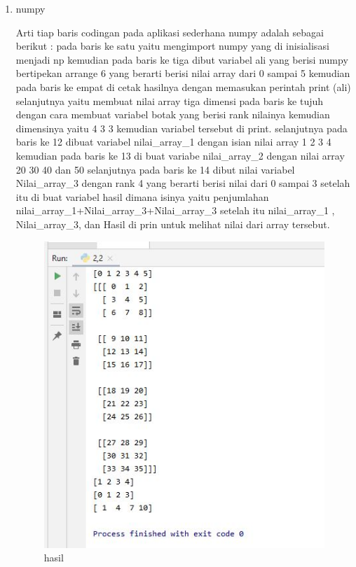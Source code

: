 \begin{enumerate}
\item numpy\par
Arti tiap baris codingan pada aplikasi sederhana numpy adalah sebagai berikut : pada baris ke satu yaitu mengimport numpy yang di inisialisasi menjadi np kemudian pada baris ke tiga dibut variabel ali yang berisi numpy bertipekan arrange 6 yang berarti berisi nilai array dari 0 sampai 5 kemudian pada baris ke empat di cetak hasilnya dengan memasukan perintah print (ali) selanjutnya yaitu membuat nilai array tiga dimensi pada baris ke tujuh dengan cara membuat variabel botak yang berisi rank nilainya kemudian dimensinya yaitu 4 3 3 kemudian variabel tersebut di print. selanjutnya pada baris ke 12 dibuat variabel nilai\_array\_1 dengan isian nilai array 1 2 3 4 kemudian pada baris ke 13 di buat variabe nilai\_array\_2 dengan nilai array 20 30 40 dan 50 selanjutnya pada baris ke 14 dibut nilai variabel Nilai\_array\_3 dengan rank 4 yang berarti berisi nilai dari 0 sampai 3 setelah itu di buat variabel hasil dimana isinya yaitu penjumlahan nilai\_array\_1+Nilai\_array\_3+Nilai\_array\_3 setelah itu nilai\_array\_1 , Nilai\_array\_3, dan Hasil di prin untuk melihat nilai dari array tersebut.

\begin{figure}[ht]
\centering
\includegraphics[scale=0.5]{figures/1174042/chapter3/2,2.JPG}
\caption{hasil}
\label{contoh}
\end{figure}


\end{enumerate}
